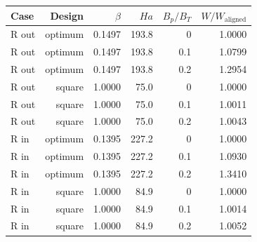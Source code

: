 \begin{tabular}{lrrrrr}
\toprule
Case & Design & $\beta$ & $Ha$ & $B_p/B_T$ & $W/W_\mathrm{aligned}$ \\
\midrule
R out & optimum & 0.1497 & 193.8 & 0 & 1.0000 \\
R out & optimum & 0.1497 & 193.8 & 0.1 & 1.0799 \\
R out & optimum & 0.1497 & 193.8 & 0.2 & 1.2954 \\
R out & square & 1.0000 & 75.0 & 0 & 1.0000 \\
R out & square & 1.0000 & 75.0 & 0.1 & 1.0011 \\
R out & square & 1.0000 & 75.0 & 0.2 & 1.0043 \\
R in & optimum & 0.1395 & 227.2 & 0 & 1.0000 \\
R in & optimum & 0.1395 & 227.2 & 0.1 & 1.0930 \\
R in & optimum & 0.1395 & 227.2 & 0.2 & 1.3410 \\
R in & square & 1.0000 & 84.9 & 0 & 1.0000 \\
R in & square & 1.0000 & 84.9 & 0.1 & 1.0014 \\
R in & square & 1.0000 & 84.9 & 0.2 & 1.0052 \\
\bottomrule
\end{tabular}
